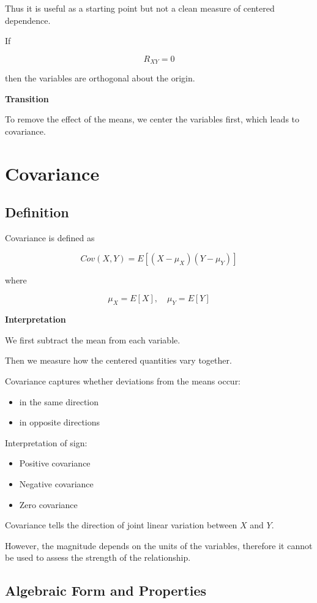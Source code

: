 \documentclass{article}
\begin{document}
Thus it is useful as a starting point but not a clean measure of centered dependence.

If

\[
R_{XY}=0
\]

then the variables are orthogonal about the origin.

\textbf{Transition}

To remove the effect of the means, we center the variables first, which leads to covariance.

\section{Covariance}

\subsection{Definition}

Covariance is defined as

\[
Cov(X,Y)=E[(X-\mu_X)(Y-\mu_Y)]
\]

where

\[
\mu_X = E[X], \quad \mu_Y = E[Y]
\]

\textbf{Interpretation}

We first subtract the mean from each variable.

Then we measure how the centered quantities vary together.

Covariance captures whether deviations from the means occur:

\begin{itemize}
\item in the same direction
\item in opposite directions
\end{itemize}

Interpretation of sign:

\begin{itemize}
\item Positive covariance
\item Negative covariance
\item Zero covariance
\end{itemize}

Covariance tells the direction of joint linear variation between $X$ and $Y$.

However, the magnitude depends on the units of the variables, therefore it cannot be used to assess the strength of the relationship.

\subsection{Algebraic Form and Properties}
\end{document}
